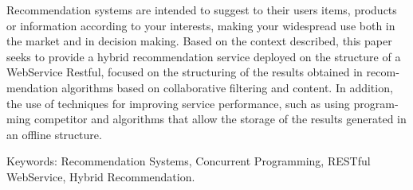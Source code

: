 \begin{resumo}[Abstract]
  \begin{otherlanguage}{english}
	  Recommendation systems are intended to suggest to their users items, products or information according to your interests, making your widespread use both in the market and in decision making. Based on the context described, this paper seeks to provide a hybrid recommendation service deployed on the structure of a WebService Restful, focused on the structuring of the results obtained in recommendation algorithms based on collaborative filtering and content. In addition, the use of techniques for improving service performance, such as using programming competitor and algorithms that allow the storage of the results generated in an offline structure.

Keywords: Recommendation Systems, Concurrent Programming, RESTful WebService, Hybrid Recommendation.
  \end{otherlanguage}
\end{resumo}